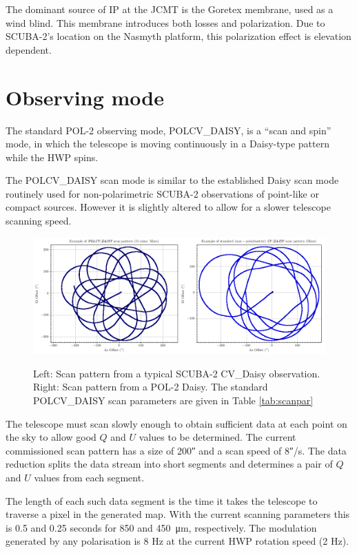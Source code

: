 The dominant source of IP at the JCMT is the Goretex membrane, used as a wind blind.
This membrane introduces both losses and polarization. Due to SCUBA-2's location
on the Nasmyth platform, this polarization effect is elevation dependent.


\section{Observing mode}
\label{sec:mmodes}

The standard POL-2 observing mode, POLCV\_DAISY, is a “scan and spin” mode,
in which the telescope is moving continuously in a Daisy-type pattern while the
HWP spins.

The POLCV\_DAISY scan mode is similar to the established Daisy scan mode
routinely used for non-polarimetric SCUBA-2 observations of point-like or compact
sources. However it is slightly altered to allow for a slower telescope scanning
speed.


\begin{figure}[t!]
\begin{center}
\includegraphics[width=0.9\linewidth]{scan_pattern_daisy_comparison.png}
\label{fig:scancompsrison}
\caption [Scan Pattern Comparison]{Left: Scan pattern from a typical SCUBA-2 CV\_Daisy
observation. Right: Scan pattern from a POL-2 Daisy. The standard POLCV\_DAISY scan
parameters are given in Table \ref{tab:scanpar}
  \small
}
\end{center}
\end{figure}




The telescope must scan slowly enough to obtain sufficient data at each
point on the sky to allow good $Q$ and $U$ values to be determined. The current
commissioned scan pattern has a size of 200\si{\arcsecond} and a scan speed of
8\si{\arcsecond}/s. The data reduction splits the data stream into short
segments and determines a pair of $Q$ and $U$ values from each segment.

The length of each such data segment is the time it takes the telescope to traverse
a pixel in the generated map. With the current scanning parameters this is 0.5 and
0.25 seconds for 850 and \SI{450}{\micro\metre}, respectively. The modulation
generated by any polarisation is 8 Hz at the current HWP rotation speed
(2 Hz).


